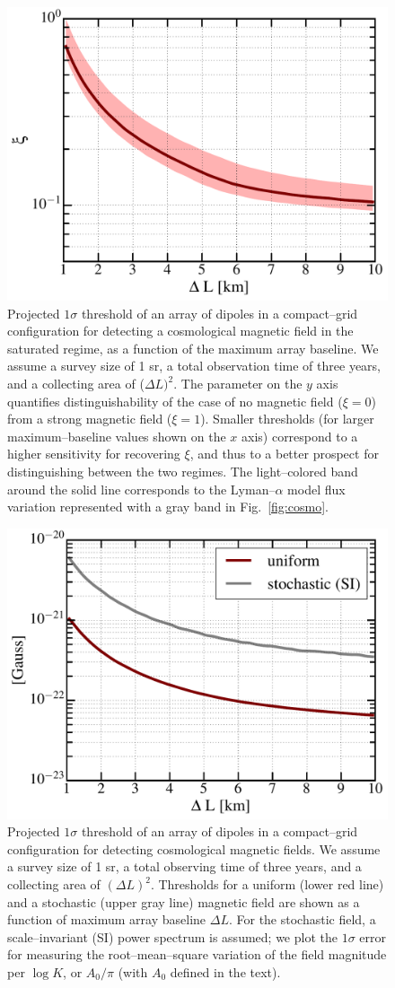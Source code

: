 \documentclass[aps,prd,twocolumn,floatfix,showpacs,superscriptaddress,nofootinbib]{revtex4-1}
\begin{document}
\begin{figure}
\centering
\includegraphics[width=.4\textwidth,keepaspectratio=true]{xi_vs_deltas.pdf}
\caption{Projected $1\sigma$ threshold of an array of dipoles in a compact--grid configuration for detecting a cosmological magnetic field in the saturated regime, as a function of the maximum array baseline. We assume a survey size of 1 sr, a total observation time of three years, and a collecting area of ($\Delta L)^2$. The parameter on the $y$ axis quantifies distinguishability of the case of no magnetic field ($\xi=0$) from a strong magnetic field ($\xi=1$). Smaller thresholds (for larger maximum--baseline values shown on the $x$ axis) correspond to a higher sensitivity for recovering $\xi$, and thus to a better prospect for distinguishing between the two regimes. The light--colored band around the solid line corresponds to the Lyman--$\alpha$ model flux variation represented with a gray band in Fig.~\ref{fig:cosmo}.\label{fig:xi_vs_deltas}}
\end{figure}
\begin{figure}
\centering
\includegraphics[width=.4\textwidth,keepaspectratio=true]{B_vs_deltas.pdf}
\caption{Projected $1\sigma$ threshold of an array of dipoles in a compact--grid configuration for detecting cosmological magnetic fields. We assume a survey size of 1 sr, a total observing time of three years, and a collecting area of $(\Delta L)^2$. Thresholds for a uniform (lower red line) and a stochastic (upper gray line) magnetic field are shown as a function of maximum array baseline $\Delta L$.  For the stochastic field, a scale--invariant (SI) power spectrum is assumed; we plot the $1\sigma$ error for measuring the root--mean--square variation of the field magnitude per $\log K$, or $A_0/\pi$ (with $A_0$ defined in the text).\label{fig:B_vs_deltas}}
\end{figure}
\end{document}

